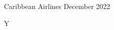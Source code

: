 \documentclass{article}
\begin{document}
\begin{center}
	Caribbean Airlines December 2022
	\begin{crossword}{15}{Y}
		
	\end{crossword}
\end{center}
\end{document}
